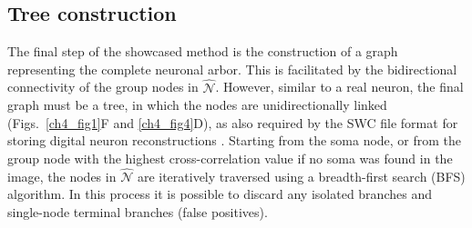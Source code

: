 \subsection{Tree construction}
\label{subsec:tree-construction}
The final step of the showcased method is the construction of a graph representing the complete neuronal arbor. This is facilitated by the bidirectional connectivity of the group nodes in $\hat{\mathcal{N}}$. However, similar to a real neuron, the final graph must be a tree, in which the nodes are unidirectionally linked (Figs.~\ref{ch4_fig1}F and \ref{ch4_fig4}D), as also required by the SWC file format for storing digital neuron reconstructions \cite{stockley1993system, cannon1998line}. Starting from the soma node, or from the group node with the highest cross-correlation value if no soma was found in the image, the nodes in $\hat{\mathcal{N}}$ are iteratively traversed using a breadth-first search (BFS) algorithm. In this process it is possible to discard any isolated branches and single-node terminal branches (false positives).

